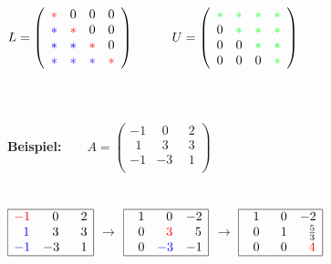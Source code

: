 	$L=	\left(\begin{array}{cccc}
			\color{red}* & 0 & 0 & 0\\
		 	\color{blue}* & \color{red}* & 0 & 0\\
			\color{blue}* & \color{blue}* & \color{red}* & 0\\
			\color{blue}* & \color{blue}* & \color{blue}* & \color{red}*\\
	\end{array}\right)$\ \ \ \ \ \ 
	$U=	\left(\begin{array}{cccc}
			\color{green}* & \color{green}* & \color{green}* & \color{green}*\\
		 	0 & \color{green}* & \color{green}* & \color{green}*\\
			0 & 0 & \color{green}* & \color{green}*\\
			0 & 0 & 0 & \color{green}*\\
	\end{array}\right)$\\\\\\\\
	\textbf{Beispiel:}\ \ \ \  
	$A=	\left(\begin{array}{ccc}
		-1 &\ \ 0 &\ \ 2\\
		 \ \ 1 &\ \ 3 &\ \ 3\\
		-1 &-3 &\ \ 1\\
	\end{array}\right)$\\\\\\ 
	$\begin{array}{|ccc|}
			\hline 
			\color{red}-1 & \ \ 0 & \ \ 2\\
			\color{blue}\ \ 1 & \ \ 3 & \ \ 3\\
			\color{blue}-1 & -3 & \ \ 1\\
			\hline
	\end{array}$
	$\rightarrow$
	$\begin{array}{|ccc|}
			\hline 
			\ \ 1 & \ \ 0 & -2\\
			\ \ 0 & \color{red}\ \ 3 & \ \ 5\\
			\ \ 0 & \color{blue}-3 & -1\\
			\hline
	\end{array}$
	$\rightarrow$
	$\begin{array}{|ccc|}
			\hline 
			\ \ 1 & \ \ 0 & -2\\
			\ \ 0 & \ \ 1 & \ \ \frac 5 3\\
			\ \ 0 & \ \ 0 & \color{red}\ \ 4\\
			\hline
	\end{array}$
